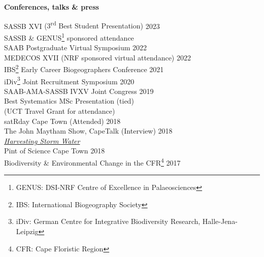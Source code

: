 \documentclass[10pt]{article}
\begin{document}
\begin{multicols}{2}
\vfill

\textbf{\large Conferences, talks \& press} %

SASSB XVI {\small (3\textsuperscript{rd} Best Student Presentation)} \hfill {\small 2023} \\
  \hspace{2em} {\small SASSB \& GENUS\footnote{GENUS: DSI-NRF Centre of Excellence in Palaeosciences} sponsored attendance} \\
SAAB Postgraduate Virtual Symposium                      \hfill {\small 2022} \\
MEDECOS XVII {\small (NRF sponsored virtual attendance)} \hfill {\small 2022} \\
IBS\footnote{IBS: International Biogeography Society}
  Early Career Biogeographers Conference                 \hfill {\small 2021} \\
iDiv\footnote{iDiv: German Centre for Integrative
  Biodiversity Research, Halle-Jena-Leipzig} Joint
  Recruitment Symposium                                  \hfill {\small 2020} \\
SAAB-AMA-SASSB IVXV Joint Congress                       \hfill {\small 2019} \\
  \hspace{2em} {\small Best Systematics MSc Presentation
    (tied)}                                                                   \\
  \hspace{2em} {\small (UCT Travel Grant for attendance)}                     \\
satRday Cape Town {\small (Attended)}                    \hfill {\small 2018} \\
The John Maytham Show, CapeTalk {\small (Interview)}     \hfill {\small 2018} \\
  \hspace{2em} {\small \href{https://www.capetalk.co.za/articles/328900/harvesting-stormwater-from-liesbeek-river-may-aid-ct-water-supply-students-find}
    {\textit{Harvesting Storm Water}}}                                        \\
Pint of Science Cape Town                                \hfill {\small 2018} \\
Biodiversity \& Environmental Change in the CFR\footnote{
  CFR: Cape Floristic Region}                            \hfill {\small 2017}

\end{multicols} %
\end{document}
